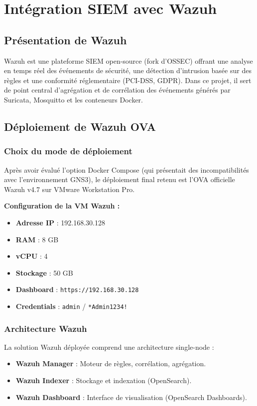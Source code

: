 \chapter{Intégration SIEM avec Wazuh}

\section{Présentation de Wazuh}

Wazuh est une plateforme SIEM open-source (fork d'OSSEC) offrant une analyse en temps réel des événements de sécurité, une détection d'intrusion basée sur des règles et une conformité réglementaire (PCI-DSS, GDPR). Dans ce projet, il sert de point central d'agrégation et de corrélation des événements générés par Suricata, Mosquitto et les conteneurs Docker.

\section{Déploiement de Wazuh OVA}

\subsection{Choix du mode de déploiement}

Après avoir évalué l'option Docker Compose (qui présentait des incompatibilités avec l'environnement GNS3), le déploiement final retenu est l'OVA officielle Wazuh v4.7 sur VMware Workstation Pro.

\textbf{Configuration de la VM Wazuh :}
\begin{itemize}
  \item \textbf{Adresse IP} : 192.168.30.128
  \item \textbf{RAM} : 8 GB
  \item \textbf{vCPU} : 4
  \item \textbf{Stockage} : 50 GB
  \item \textbf{Dashboard} : \texttt{https://192.168.30.128}
  \item \textbf{Credentials} : \texttt{admin} / \texttt{*Admin1234!}
\end{itemize}

\subsection{Architecture Wazuh}

La solution Wazuh déployée comprend une architecture single-node :
\begin{itemize}
  \item \textbf{Wazuh Manager} : Moteur de règles, corrélation, agrégation.
  \item \textbf{Wazuh Indexer} : Stockage et indexation (OpenSearch).
  \item \textbf{Wazuh Dashboard} : Interface de visualisation (OpenSearch Dashboards).
\end{itemize}

